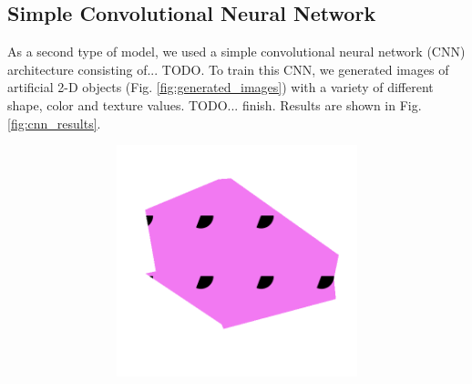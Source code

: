 \subsection{Simple Convolutional Neural Network}
\label{sec:simple_cnn}
As a second type of model, we used a simple convolutional neural network (CNN) architecture
consisting of... TODO. To train this CNN, we generated images of artificial 2-D objects
(Fig. \ref{fig:generated_images}) with a variety of different shape, color and texture values. TODO... finish.
Results are shown in Fig. \ref{fig:cnn_results}.

\begin{figure}[h!]
    \begin{center}
        \begin{subfigure}[b]{0.15\textwidth}
            \begin{center}
                \begin{subfigure}[b]{0.9\textwidth}
                    \includegraphics[width=\linewidth]{figures/generated_objects/img0000.png}
                \end{subfigure}
                \begin{subfigure}[b]{0.9\textwidth}

\end{subfigure}
\end{center}
\end{subfigure}
\end{center}
\end{figure}
